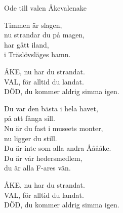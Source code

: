 \begin{song}{Ode till valen Åke}{valenake}
\begin{vers}
Timmen är slagen,\\
nu strandar du på magen,\\
har gått iland,\\
i Träslövsläges hamn.\\
\end{vers}
\begin{vers}
ÅKE, nu har du strandat.\\
VAL, för alltid du landat.\\
DÖD, du kommer aldrig simma igen.\\
\end{vers}
\begin{vers}
Du var den bästa i hela havet,\\
på att fånga sill.\\
Nu är du fast i museets monter,\\
nu ligger du still.\\
Du är inte som alla andra Ååååke.\\
Du är vår hedersmedlem,\\
du är alla F-ares vän.\\
\end{vers}
\begin{vers}
ÅKE, nu har du strandat.\\
VAL, för alltid du landat.\\
DÖD, du kommer aldrig simma igen.\\
\end{vers}
\end{song}
